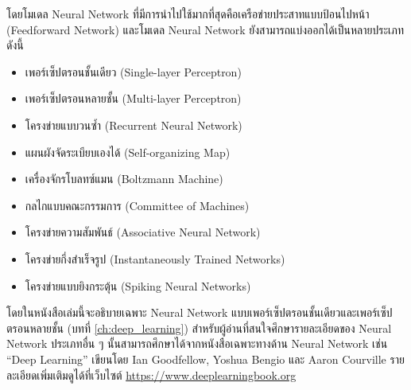 โดยโมเดล Neural Network ที่มีการนำไปใช้มากที่สุดคือเครือข่ายประสาทแบบป้อนไปหน้า (Feedforward Network) และโมเดล Neural Network 
ยังสามารถแบ่งออกได้เป็นหลายประเภท ดังนี้

\begin{itemize}
    \item เพอร์เซ็ปตรอนชั้นเดียว (Single-layer Perceptron)
    
    \item เพอร์เซ็ปตรอนหลายชั้น (Multi-layer Perceptron)
    
    \item โครงข่ายแบบวนซ้ำ (Recurrent Neural Network)
    
    \item แผนผังจัดระเบียบเองได้ (Self-organizing Map)
    
    \item เครื่องจักรโบลทซ์แมน (Boltzmann Machine)
    
    \item กลไกแบบคณะกรรมการ (Committee of Machines)
    
    \item โครงข่ายความสัมพันธ์ (Associative Neural Network)
    
    \item โครงข่ายกึ่งสำเร็จรูป (Instantaneously Trained Networks)
    
    \item โครงข่ายแบบยิงกระตุ้น (Spiking Neural Networks) 
\end{itemize}

โดยในหนังสือเล่มนี้จะอธิบายเฉพาะ Neural Network แบบเพอร์เซ็ปตรอนชั้นเดียวและเพอร์เซ็ปตรอนหลายชั้น (บทที่ \ref{ch:deep_learning}) 
สำหรับผู้อ่านที่สนใจศึกษารายละเอียดของ Neural Network ประเภทอื่น ๆ นั้นสามารถศึกษาได้จากหนังสือเฉพาะทางด้าน Neural Network เช่น 
\enquote{Deep Learning} เขียนโดย Ian Goodfellow, Yoshua Bengio และ Aaron Courville\autocite{Goodfellow-et-al-2016} 
รายละเอียดเพิ่มเติมดูได้ที่เว็บไซต์ \url{https://www.deeplearningbook.org}
